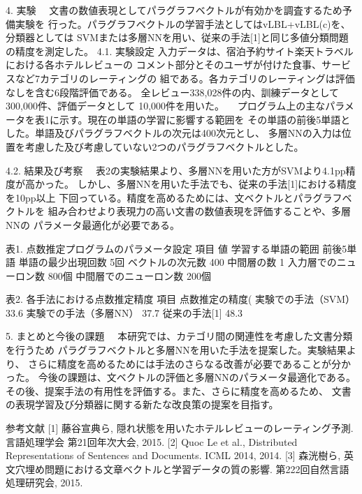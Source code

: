 \documentclass[12pt, unicode]{beamer}
\begin{document}
4. 実験
　文書の数値表現としてパラグラフベクトルが有効かを調査するため予備実験を
行った。パラグラフベクトルの学習手法としてはvLBL+vLBL(c)を、分類器としては
SVMまたは多層NNを用い、従来の手法[1]と同じ多値分類問題の精度を測定した。
4.1. 実験設定
入力データは、宿泊予約サイト楽天トラベルにおける各ホテルレビューの
コメント部分とそのユーザが付けた食事、サービスなど7カテゴリのレーティングの
組である。各カテゴリのレーティングは評価なしを含む6段階評価である。
全レビュー338,028件の内、訓練データとして300,000件、評価データとして
10,000件を用いた。
　プログラム上の主なパラメータを表1に示す。現在の単語の学習に影響する範囲を
その単語の前後5単語とした。単語及びパラグラフベクトルの次元は400次元とし、
多層NNの入力は位置を考慮した及び考慮していない2つのパラグラフベクトルとした。

4.2. 結果及び考察
　表2の実験結果より、多層NNを用いた方がSVMより4.1pp精度が高かった。
しかし、多層NNを用いた手法でも、従来の手法[1]における精度を10pp以上
下回っている。精度を高めるためには、文ベクトルとパラグラフベクトルを
組み合わせより表現力の高い文書の数値表現を評価することや、多層NNの
パラメータ最適化が必要である。

表1. 点数推定プログラムのパラメータ設定
項目
値
学習する単語の範囲
前後5単語
単語の最少出現回数
5回
ベクトルの次元数
400
中間層の数
1
入力層でのニューロン数
800個
中間層でのニューロン数
200個

表2. 各手法における点数推定精度
項目
点数推定の精度(%
実験での手法（SVM）
33.6
実験での手法（多層NN）
37.7
従来の手法[1]
48.3


5. まとめと今後の課題
　本研究では、カテゴリ間の関連性を考慮した文書分類を行うため
パラグラフベクトルと多層NNを用いた手法を提案した。実験結果より、
さらに精度を高めるためには手法のさらなる改善が必要であることが分かった。
今後の課題は、文ベクトルの評価と多層NNのパラメータ最適化である。
その後、提案手法の有用性を評価する。また、さらに精度を高めるため、
文書の表現学習及び分類器に関する新たな改良策の提案を目指す。


参考文献
[1] 藤谷宣典ら, 隠れ状態を用いたホテルレビューのレーティング予測.
言語処理学会 第21回年次大会, 2015.
[2] Quoc Le et al., Distributed Representations of Sentences and Documents.
ICML 2014, 2014.
[3] 森洸樹ら, 英文穴埋め問題における文章ベクトルと学習データの質の影響.
第222回自然言語処理研究会, 2015.
\end{document}
